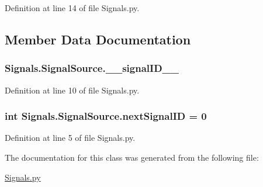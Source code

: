 Definition at line 14 of file Signals.\+py.



\subsection{Member Data Documentation}
\subsubsection[{\texorpdfstring{\+\_\+\+\_\+signal\+I\+D\+\_\+\+\_\+}{__signalID__}}]{\setlength{\rightskip}{0pt plus 5cm}Signals.\+Signal\+Source.\+\_\+\+\_\+signal\+I\+D\+\_\+\+\_\+\hspace{0.3cm}{\ttfamily [private]}}\hypertarget{classSignals_1_1SignalSource_a83c7d24dc35a94a5efaa2b6418b0f587}{}\label{classSignals_1_1SignalSource_a83c7d24dc35a94a5efaa2b6418b0f587}


Definition at line 10 of file Signals.\+py.

\subsubsection[{\texorpdfstring{next\+Signal\+ID}{nextSignalID}}]{\setlength{\rightskip}{0pt plus 5cm}int Signals.\+Signal\+Source.\+next\+Signal\+ID = 0\hspace{0.3cm}{\ttfamily [static]}}\hypertarget{classSignals_1_1SignalSource_abcff0d069f17cb5ebe3eff15b6283a64}{}\label{classSignals_1_1SignalSource_abcff0d069f17cb5ebe3eff15b6283a64}


Definition at line 5 of file Signals.\+py.



The documentation for this class was generated from the following file\+:\begin{DoxyCompactItemize}
\item 
\hyperlink{Signals_8py}{Signals.\+py}\end{DoxyCompactItemize}
